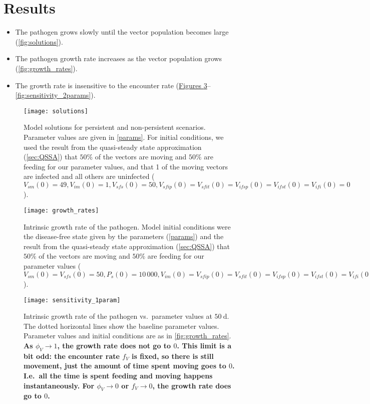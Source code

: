 \documentclass{article}
\newcommand{\comment}[1]{\textbf{#1}}
\begin{document}
\section{Results}

\begin{itemize}
\item The pathogen grows slowly until the vector population becomes
  large (\autoref{fig:solutions}).

\item The pathogen growth rate increases as the vector population
  grows (\autoref{fig:growth_rates}).

\item The growth rate is insensitive to the encounter rate
  (\hyperref[fig:sensitivity_1param]{Figures
    \ref*{fig:sensitivity_1param}}--\ref{fig:sensitivity_2params}).
\end{itemize}


\begin{figure}
  \centering
  \texttt{[image: solutions]}
  \caption{Model solutions for persistent and non-persistent
    scenarios.  Parameter values are given in \autoref{params}.
    For initial conditions, we used the result from the quasi-steady
    state approximation (\autoref{sec:QSSA}) that $50\%$ of the
    vectors are moving and $50\%$ are feeding for our parameter
    values, and that 1 of the moving vectors are infected and all
    others are uninfected ($V_{sm}(0) = 49, V_{im}(0) = 1, V_{sfs}(0) =
    50, V_{sfip}(0) = V_{sfit}(0) = V_{ifsp}(0) = V_{ifst}(0) =
    V_{ifi}(0) = 0$).}
  \label{fig:solutions}
\end{figure}

\begin{figure}
  \centering
  \texttt{[image: growth\_rates]}
  \caption{Intrinsic growth rate of the pathogen.  Model initial
    conditions were the disease-free state given by the parameters
    (\autoref{params}) and the result from the quasi-steady state
    approximation (\autoref{sec:QSSA}) that $50\%$ of the vectors are
    moving and $50\%$ are feeding for our parameter values ($V_{sm}(0)
    = V_{sfs}(0) = 50, P_s(0) = 10\,000, V_{im}(0) = V_{sfip}(0) =
    V_{sfit}(0) = V_{ifsp}(0) = V_{ifst}(0) = V_{ifi}(0) = P_i(0) =
    0$).}
  \label{fig:growth_rates}
\end{figure}

\begin{figure}
  \centering
  \texttt{[image: sensitivity\_1param]}
  \caption{Intrinsic growth rate of the pathogen vs.~parameter values
    at $50~\text{d}$.  The dotted horizontal lines show the baseline
    parameter values.  Parameter values and initial conditions are as
    in \autoref{fig:growth_rates}.
    \comment{As $\phi_V \to 1$, the
      growth rate does not go to $0$.  This limit is a bit odd: the
      encounter rate $f_V$ is fixed, so there is still movement, just
      the amount of time spent moving goes to $0$.  I.e.~all the time
      is spent feeding and moving happens instantaneously.  For
      $\phi_V \to 0$ or $f_V \to 0$, the growth rate does go to $0$.}}
  \label{fig:sensitivity_1param}
\end{figure}
\end{document}
